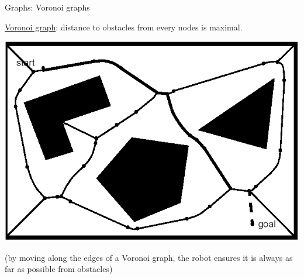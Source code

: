 \documentclass[compress,xcolor=table]{beamer}
\begin{document}
\begin{frame}{Graphs: Voronoi graphs}

    \href{http://alexbeutel.com/webgl/voronoi.html}{Voronoi graph}: distance to obstacles from every nodes is maximal.

    \begin{center}
        \includegraphics[width=0.7\linewidth]{voronoi}
    \end{center}

    (by moving along the edges of a Voronoi graph, the robot ensures it is
    always as far as possible from obstacles)

\end{frame}
\end{document}

